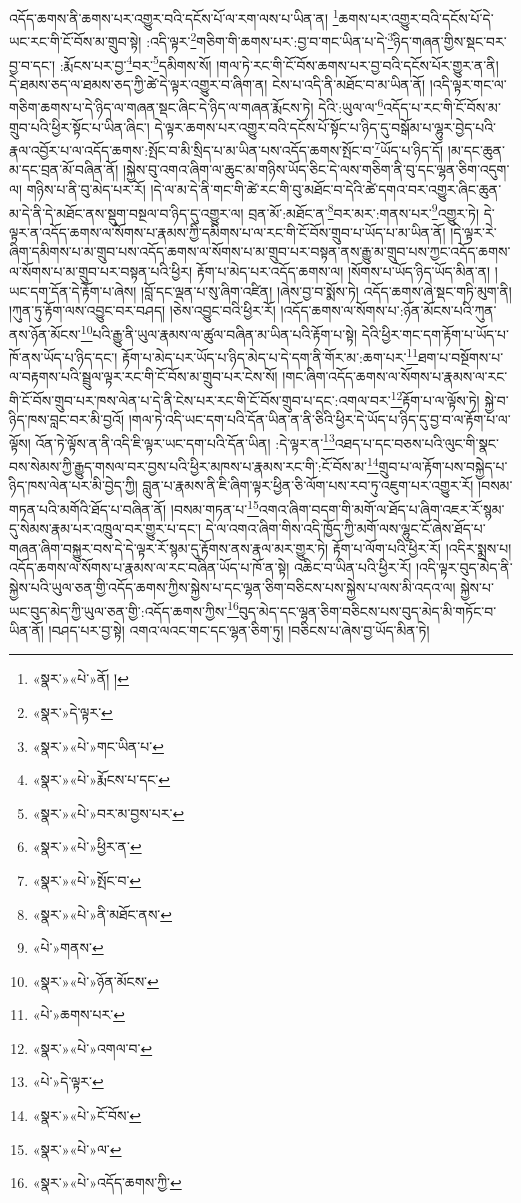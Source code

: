 འདོད་ཆགས་ནི་ཆགས་པར་འགྱུར་བའི་དངོས་པོ་ལ་རག་ལས་པ་ཡིན་ན། \footnote{«སྣར་»«པེ་»ནོ། ། }ཆགས་པར་འགྱུར་བའི་དངོས་པོ་དེ་ཡང་རང་གི་ངོ་བོས་མ་གྲུབ་སྟེ། :འདི་ལྟར་\footnote{«སྣར་»དེ་ལྟར་}གཅིག་གི་ཆགས་པར་:བྱ་བ་གང་ཡིན་པ་དེ་\footnote{«སྣར་»«པེ་»གང་ཡིན་པ་}ཉིད་གཞན་གྱིས་སྡང་བར་བྱ་བ་དང་། :རྨོངས་པར་བྱ་\footnote{«སྣར་»«པེ་»རྨོངས་པ་དང་}བར་\footnote{«སྣར་»«པེ་»བར་མ་བྱས་པར་}དམིགས་སོ། །གལ་ཏེ་རང་གི་ངོ་བོས་ཆགས་པར་བྱ་བའི་དངོས་པོར་གྱུར་ན་ནི། དེ་ཐམས་ཅད་ལ་ཐམས་ཅད་ཀྱི་ཚེ་དེ་ལྟར་འགྱུར་བ་ཞིག་ན། ངེས་པ་འདི་ནི་མཐོང་བ་མ་ཡིན་ནོ། །འདི་ལྟར་གང་ལ་གཅིག་ཆགས་པ་དེ་ཉིད་ལ་གཞན་སྡང་ཞིང་དེ་ཉིད་ལ་གཞན་རྨོངས་ཏེ། དེའི་:ཡུལ་ལ་\footnote{«སྣར་»«པེ་»ཕྱིར་ན་}འདོད་པ་རང་གི་ངོ་བོས་མ་གྲུབ་པའི་ཕྱིར་སྟོང་པ་ཡིན་ཞིང་། དེ་ལྟར་ཆགས་པར་འགྱུར་བའི་དངོས་པོ་སྟོང་པ་ཉིད་དུ་བསྒོམ་པ་ལྷུར་བྱེད་པའི་རྣལ་འབྱོར་པ་ལ་འདོད་ཆགས་:སྤོང་བ་མི་སྲིད་པ་མ་ཡིན་པས་འདོད་ཆགས་སྤོང་བ་\footnote{«སྣར་»«པེ་»སྤོང་བ་}ཡོད་པ་ཉིད་དོ། །མ་དང་ཆུན་མ་དང་བྲན་མོ་བཞིན་ནོ། །སྐྱེས་བུ་འགའ་ཞིག་ལ་ཆུང་མ་གཉིས་ཡོད་ཅིང་དེ་ལས་གཅིག་ནི་བུ་དང་ལྷན་ཅིག་འདུག་ལ། གཉིས་པ་ནི་བུ་མེད་པར་རོ། །དེ་ལ་མ་དེ་ནི་གང་གི་ཚེ་རང་གི་བུ་མཐོང་བ་དེའི་ཚེ་དགའ་བར་འགྱུར་ཞིང་ཆུན་མ་དེ་ནི་དེ་མཐོང་ནས་སྡུག་བསྔལ་བ་ཉིད་དུ་འགྱུར་ལ། བྲན་མོ་:མཐོང་ན་\footnote{«སྣར་»«པེ་»ནི་མཐོང་ནས་}བར་མར་:གནས་པར་\footnote{«པེ་»གནས་}འགྱུར་ཏེ། དེ་ལྟར་ན་འདོད་ཆགས་ལ་སོགས་པ་རྣམས་ཀྱི་དམིགས་པ་ལ་རང་གི་ངོ་བོས་གྲུབ་པ་ཡོད་པ་མ་ཡིན་ནོ། །དེ་ལྟར་རེ་ཞིག་དམིགས་པ་མ་གྲུབ་པས་འདོད་ཆགས་ལ་སོགས་པ་མ་གྲུབ་པར་བསྟན་ནས་རྒྱུ་མ་གྲུབ་པས་ཀྱང་འདོད་ཆགས་ལ་སོགས་པ་མ་གྲུབ་པར་བསྟན་པའི་ཕྱིར། རྟོག་པ་མེད་པར་འདོད་ཆགས་ལ། །སོགས་པ་ཡོད་ཉིད་ཡོད་མིན་ན། །ཡང་དག་དོན་དེ་རྟོག་པ་ཞེས། །བློ་དང་ལྡན་པ་སུ་ཞིག་འཛིན། །ཞེས་བྱ་བ་སྨོས་ཏེ། འདོད་ཆགས་ཞེ་སྡང་གཏི་མུག་ནི། །ཀུན་ཏུ་རྟོག་ལས་འབྱུང་བར་བཤད། །ཅེས་འབྱུང་བའི་ཕྱིར་རོ། །འདོད་ཆགས་ལ་སོགས་པ་:ཉོན་མོངས་པའི་ཀུན་ནས་ཉོན་མོངས་\footnote{«སྣར་»«པེ་»ཉོན་མོངས་}པའི་རྒྱུ་ནི་ཡུལ་རྣམས་ལ་ཚུལ་བཞིན་མ་ཡིན་པའི་རྟོག་པ་སྟེ། དེའི་ཕྱིར་གང་དག་རྟོག་པ་ཡོད་པ་ཁོ་ནས་ཡོད་པ་ཉིད་དང་། རྟོག་པ་མེད་པར་ཡོད་པ་ཉིད་མེད་པ་དེ་དག་ནི་གོར་མ་:ཆག་པར་\footnote{«པེ་»ཆགས་པར་}ཐག་པ་བསྔོགས་པ་ལ་བརྟགས་པའི་སྦྲུལ་ལྟར་རང་གི་ངོ་བོས་མ་གྲུབ་པར་ངེས་སོ། །གང་ཞིག་འདོད་ཆགས་ལ་སོགས་པ་རྣམས་ལ་རང་གི་ངོ་བོས་གྲུབ་པར་ཁས་ལེན་པ་དེ་ནི་ངེས་པར་རང་གི་ངོ་བོས་གྲུབ་པ་དང་:འགལ་བར་\footnote{«སྣར་»«པེ་»འགལ་བ་}རྟོག་པ་ལ་ལྟོས་ཏེ། སྐྱེ་བ་ཉིད་ཁས་བླང་བར་མི་བྱའོ། །གལ་ཏེ་འདི་ཡང་དག་པའི་དོན་ཡིན་ན་ནི་ཅིའི་ཕྱིར་དེ་ཡོད་པ་ཉིད་དུ་བྱ་བ་ལ་རྟོག་པ་ལ་ལྟོས། འོན་ཏེ་ལྟོས་ན་ནི་འདི་ཇི་ལྟར་ཡང་དག་པའི་དོན་ཡིན། :དེ་ལྟར་ན་\footnote{«པེ་»དེ་ལྟར་}འཐད་པ་དང་བཅས་པའི་ལུང་གི་སྣང་བས་སེམས་ཀྱི་རྒྱུད་གསལ་བར་བྱས་པའི་ཕྱིར་མཁས་པ་རྣམས་རང་གི་:ངོ་བོས་མ་\footnote{«སྣར་»«པེ་»ངོ་བོས་}གྲུབ་པ་ལ་རྟོག་པས་བསྐྱེད་པ་ཉིད་ཁས་ལེན་པར་མི་བྱེད་ཀྱི། བླུན་པ་རྣམས་ནི་ཇི་ཞིག་ལྟར་ཕྱིན་ཅི་ལོག་པས་རབ་ཏུ་འཇུག་པར་འགྱུར་རོ། །བསམ་གཏན་པའི་མགོའི་ཐོད་པ་བཞིན་ནོ། །བསམ་གཏན་པ་\footnote{«སྣར་»«པེ་»ལ་}འགའ་ཞིག་བདག་གི་མགོ་ལ་ཐོད་པ་ཞིག་འཇར་རོ་སྙམ་དུ་སེམས་རྣམ་པར་འཁྲུལ་བར་གྱུར་པ་དང་། དེ་ལ་འགའ་ཞིག་གིས་འདི་ཁྱོད་ཀྱི་མགོ་ལས་ལྷུང་ངོ་ཞེས་ཐོད་པ་གཞན་ཞིག་བསྐྱུར་བས་དེ་དེ་ལྟར་རོ་སྙམ་དུ་རྟོགས་ནས་རྣལ་མར་གྱུར་ཏེ། རྟོག་པ་ལོག་པའི་ཕྱིར་རོ། །འདིར་སྨྲས་པ། འདོད་ཆགས་ལ་སོགས་པ་རྣམས་ལ་རང་བཞིན་ཡོད་པ་ཁོ་ན་སྟེ། འཆིང་བ་ཡིན་པའི་ཕྱིར་རོ། །འདི་ལྟར་བུད་མེད་ནི་སྐྱེས་པའི་ཡུལ་ཅན་གྱི་འདོད་ཆགས་ཀྱིས་སྐྱེས་པ་དང་ལྷན་ཅིག་བཅིངས་པས་སྐྱེས་པ་ལས་མི་འདའ་ལ། སྐྱེས་པ་ཡང་བུད་མེད་ཀྱི་ཡུལ་ཅན་གྱི་:འདོད་ཆགས་ཀྱིས་\footnote{«སྣར་»«པེ་»འདོད་ཆགས་ཀྱི་}བུད་མེད་དང་ལྷན་ཅིག་བཅིངས་པས་བུད་མེད་མི་གཏོང་བ་ཡིན་ནོ། །བཤད་པར་བྱ་སྟེ། འགའ་ལའང་གང་དང་ལྷན་ཅིག་ཏུ། །བཅིངས་པ་ཞེས་བྱ་ཡོད་མིན་ཏེ། 